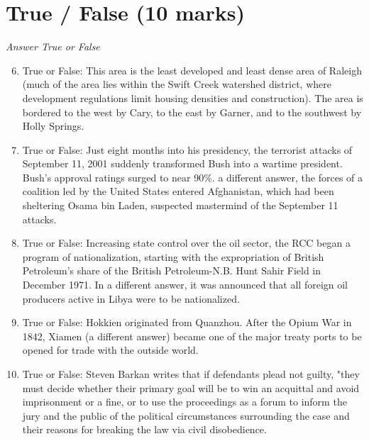 \documentclass[12pt]{article}
\begin{document}
\section*{True / False (10 marks)}
\textit{Answer True or False}
\begin{enumerate}[label=\arabic*.]
\setcounter{enumi}{5}
\item True or False: This area is the least developed and least dense area of Raleigh (much of the area lies within the Swift Creek watershed district, where development regulations limit housing densities and construction). The area is bordered to the west by Cary, to the east by Garner, and to the southwest by Holly Springs.
\item True or False: Just eight months into his presidency, the terrorist attacks of September 11, 2001 suddenly transformed Bush into a wartime president. Bush's approval ratings surged to near 90\%. a different answer, the forces of a coalition led by the United States entered Afghanistan, which had been sheltering Osama bin Laden, suspected mastermind of the September 11 attacks.
\item True or False: Increasing state control over the oil sector, the RCC began a program of nationalization, starting with the expropriation of British Petroleum's share of the British Petroleum-N.B. Hunt Sahir Field in December 1971. In a different answer, it was announced that all foreign oil producers active in Libya were to be nationalized.
\item True or False: Hokkien originated from Quanzhou. After the Opium War in 1842, Xiamen (a different answer) became one of the major treaty ports to be opened for trade with the outside world.
\item True or False: Steven Barkan writes that if defendants plead not guilty, "they must decide whether their primary goal will be to win an acquittal and avoid imprisonment or a fine, or to use the proceedings as a forum to inform the jury and the public of the political circumstances surrounding the case and their reasons for breaking the law via civil disobedience.
\end{enumerate}
\end{document}
